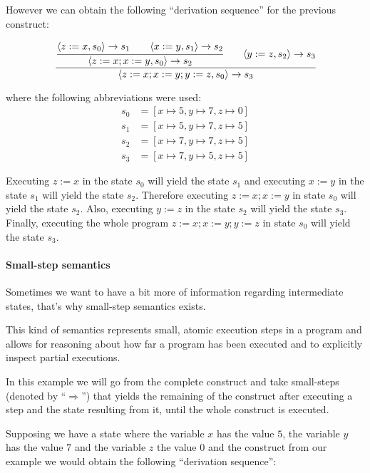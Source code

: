 However we can obtain the following \enquote{derivation sequence} for the previous construct:

\begin{equation*}
\cfrac{
  \cfrac{\langle z:=x, s_{0}\rangle \rightarrow s_{1} \qquad \langle x:=y, s_{1} \rangle \rightarrow s_{2}}
    {\langle z:=x; x:=y, s_{0} \rangle \rightarrow s_{2}}
  \qquad
  \langle y:=z, s_{2} \rangle \rightarrow s_{3}
  }
  {\langle z:=x; x:=y; y:=z, s_{0} \rangle \rightarrow s_{3}}
\end{equation*}

where the following abbreviations were used:
\begin{align*}
s_{0} &= [x\mapsto5, y\mapsto7, z\mapsto0]\\
s_{1} &= [x\mapsto5, y\mapsto7, z\mapsto5]\\
s_{2} &= [x\mapsto7, y\mapsto7, z\mapsto5]\\
s_{3} &= [x\mapsto7, y\mapsto5, z\mapsto5]
\end{align*}

Executing $z:=x$ in the state $s_{0}$ will yield the state $s_{1}$ and executing $x:=y$ in the state $s_{1}$ will yield the state $s_{2}$.
Therefore executing $z:=x; x:=y$ in state $s_{0}$ will yield the state $s_{2}$.
Also, executing $y:=z$ in the state $s_{2}$ will yield the state $s_{3}$.
Finally, executing the whole program $z:=x; x:=y; y:=z$ in state $s_{0}$ will yield the state $s_{3}$.

\paragraph{Small-step semantics}

Sometimes we want to have a bit more of information regarding intermediate states, that's why small-step semantics exists.

This kind of semantics represents small, atomic execution steps in a program and allows for reasoning about how far a program has been executed and to explicitly inspect partial executions.~\parencite{nipkow}

In this example we will go from the complete construct and take small-steps (denoted by ``$\Rightarrow$'') that yields the remaining of the construct after executing a step and the state resulting from it, until the whole construct is executed.

Supposing we have a state where the variable $x$ has the value $5$, the variable $y$ has the value $7$ and the variable $z$ the value $0$ and the construct from our example we would obtain the following \enquote{derivation sequence}:

